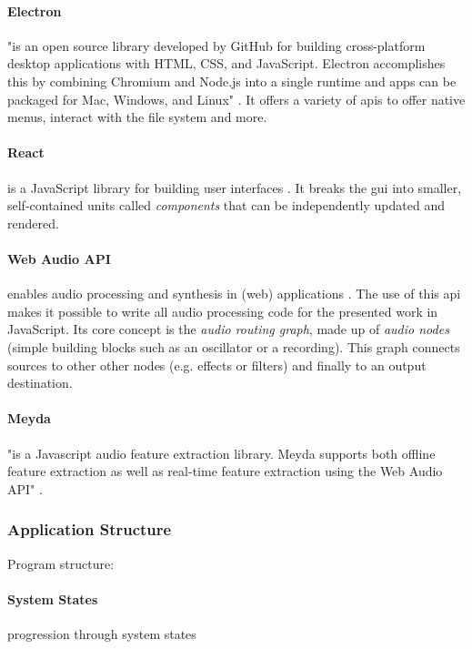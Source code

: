 \paragraph{Electron}
\label{para:electron}
"is an open source library developed by GitHub for building cross-platform desktop applications with HTML, CSS, and JavaScript. Electron accomplishes this by combining Chromium and Node.js into a single runtime and apps can be packaged for Mac, Windows, and Linux" \citep{electron2019}. It offers a variety
of \glspl{api} to offer native menus, interact with the file system and more.

\paragraph{React}
\label{para:react}
is a JavaScript library for building user interfaces \citep{react2019}. It
breaks the \gls{gui} into smaller, self-contained units called
\textit{components} that can be independently updated and rendered.

\paragraph{Web Audio API}
\label{para:web_audio_api}
enables audio processing and synthesis in (web) applications
\citep{webaudio2019}. The use of this \gls{api} makes it possible to write all
audio processing code for the presented work in JavaScript. Its core concept is
the \textit{audio routing graph}, made up of \textit{audio nodes} (simple
building blocks such as an oscillator or a recording). This graph connects
sources to other other nodes (e.g. effects or filters) and finally to an output
destination.

\paragraph{Meyda}
\label{para:meyda}
"is a Javascript audio feature extraction library. Meyda supports both offline
feature extraction as well as real-time feature extraction using the Web Audio
API" \citep{web:meyda2019}.

\subsubsection{Application Structure}
\label{subsubsec:som-browser_structure}

Program structure:

\paragraph{System States}
\label{para:som-browser_states}
progression through system states


